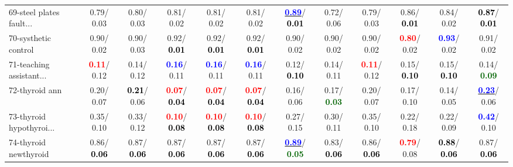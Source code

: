 \begin{table}[h]
\begin{center}
{\begin{tabular}{lc|c|c|c|c|c|c|c|c|c|c}
69-steel plates fault... &   0.79/  0.03 &   0.80/  0.03 &   0.81/  0.02 &   0.81/  0.02 &   0.81/  0.02 & \underline{\textcolor{blue}{\textbf{  0.89}}}/\textcolor{black}{\textbf{  0.01}} &   0.72/  0.06 &   0.79/  0.03 &   0.86/\textcolor{black}{\textbf{  0.01}} &   0.84/  0.02 & \textcolor{black}{\textbf{  0.87}}/\textcolor{black}{\textbf{  0.01}} \\
70-systhetic control &   0.90/  0.02 &   0.90/  0.03 &   0.92/\textcolor{black}{\textbf{  0.01}} &   0.92/\textcolor{black}{\textbf{  0.01}} &   0.92/\textcolor{black}{\textbf{  0.01}} &   0.90/  0.02 &   0.90/  0.02 &   0.90/  0.02 & \textcolor{red}{\textbf{  0.80}}/  0.02 & \textcolor{blue}{\textbf{  0.93}}/  0.02 &   0.91/  0.02 \\
71-teaching assistant... & \textcolor{red}{\textbf{  0.11}}/  0.12 &   0.14/  0.12 & \textcolor{blue}{\textbf{  0.16}}/  0.11 & \textcolor{blue}{\textbf{  0.16}}/  0.11 & \textcolor{blue}{\textbf{  0.16}}/  0.11 &   0.12/\textcolor{black}{\textbf{  0.10}} &   0.14/  0.11 & \textcolor{red}{\textbf{  0.11}}/  0.12 &   0.15/\textcolor{black}{\textbf{  0.10}} &   0.15/\textcolor{black}{\textbf{  0.10}} &   0.14/\textcolor{darkgreen}{\textbf{  0.09}} \\ \hline
72-thyroid ann &   0.20/  0.07 & \textcolor{black}{\textbf{  0.21}}/  0.06 & \textcolor{red}{\textbf{  0.07}}/\textcolor{black}{\textbf{  0.04}} & \textcolor{red}{\textbf{  0.07}}/\textcolor{black}{\textbf{  0.04}} & \textcolor{red}{\textbf{  0.07}}/\textcolor{black}{\textbf{  0.04}} &   0.16/  0.06 &   0.17/\textcolor{darkgreen}{\textbf{  0.03}} &   0.20/  0.07 &   0.17/  0.10 &   0.14/  0.05 & \underline{\textcolor{blue}{\textbf{  0.23}}}/  0.06 \\
73-thyroid hypothyroi... &   0.35/  0.10 &   0.33/  0.12 & \textcolor{red}{\textbf{  0.10}}/\textcolor{black}{\textbf{  0.08}} & \textcolor{red}{\textbf{  0.10}}/\textcolor{black}{\textbf{  0.08}} & \textcolor{red}{\textbf{  0.10}}/\textcolor{black}{\textbf{  0.08}} &   0.27/  0.15 &   0.30/  0.11 &   0.35/  0.10 &   0.22/  0.18 &   0.22/  0.09 & \textcolor{blue}{\textbf{  0.42}}/  0.10 \\
74-thyroid newthyroid &   0.86/\textcolor{black}{\textbf{  0.06}} &   0.87/\textcolor{black}{\textbf{  0.06}} &   0.87/\textcolor{black}{\textbf{  0.06}} &   0.87/\textcolor{black}{\textbf{  0.06}} &   0.87/\textcolor{black}{\textbf{  0.06}} & \underline{\textcolor{blue}{\textbf{  0.89}}}/\textcolor{darkgreen}{\textbf{  0.05}} &   0.83/\textcolor{black}{\textbf{  0.06}} &   0.86/\textcolor{black}{\textbf{  0.06}} & \textcolor{red}{\textbf{  0.79}}/  0.08 & \textcolor{black}{\textbf{  0.88}}/\textcolor{black}{\textbf{  0.06}} &   0.87/\textcolor{black}{\textbf{  0.06}} \\

\end{tabular}}
\end{center}
\end{table}
